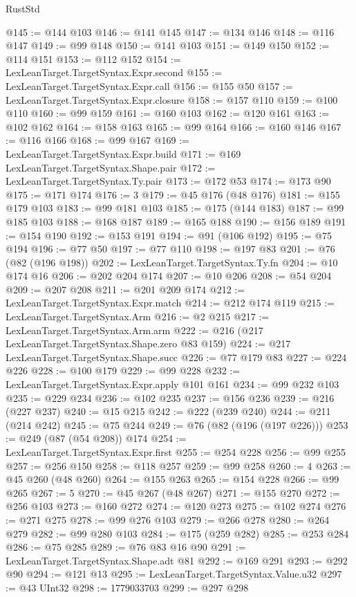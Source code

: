 \begin{lexlean}{RustStd}
\begin{coremodule}
{\begin{coremodule}
{{{{{{{{{{{{{{{{{{{{{{{{{{{{{{{{{@145 := @144 @103
@146 := @141 @145
@147 := @134 @146
@148 := @116 @147
@149 := @99 @148
@150 := @141 @103
@151 := @149 @150
@152 := @114 @151
@153 := @112 @152
@154 := LexLeanTarget.TargetSyntax.Expr.second
@155 := LexLeanTarget.TargetSyntax.Expr.call
@156 := @155 @50
@157 := LexLeanTarget.TargetSyntax.Expr.closure
@158 := @157 @110
@159 := @100 @110
@160 := @99 @159
@161 := @160 @103
@162 := @120 @161
@163 := @102 @162
@164 := @158 @163
@165 := @99 @164
@166 := @160 @146
@167 := @116 @166
@168 := @99 @167
@169 := LexLeanTarget.TargetSyntax.Expr.build
@171 := @169 LexLeanTarget.TargetSyntax.Shape.pair
@172 := LexLeanTarget.TargetSyntax.Ty.pair
@173 := @172 @53
@174 := @173 @90
@175 := @171 @174
@176 := 3
@179 := @45 @176 (@48 @176)
@181 := @155 @179 @103
@183 := @99 @181 @103
@185 := @175 (@144 @183)
@187 := @99 @185 @103
@188 := @168 @187
@189 := @165 @188
@190 := @156 @189
@191 := @154 @190
@192 := @153 @191
@194 := @91 (@106 @192)
@195 := @75 @194
@196 := @77 @50
@197 := @77 @110
@198 := @197 @83
@201 := @76 (@82 (@196 @198))
@202 := LexLeanTarget.TargetSyntax.Ty.fn
@204 := @10 @174 @16
@206 := @202 @204 @174
@207 := @10 @206
@208 := @54 @204
@209 := @207 @208
@211 := @201 @209 @174
@212 := LexLeanTarget.TargetSyntax.Expr.match
@214 := @212 @174 @119
@215 := LexLeanTarget.TargetSyntax.Arm
@216 := @2 @215
@217 := LexLeanTarget.TargetSyntax.Arm.arm
@222 := @216 (@217 LexLeanTarget.TargetSyntax.Shape.zero @83 @159)
@224 := @217 LexLeanTarget.TargetSyntax.Shape.succ
@226 := @77 @179 @83
@227 := @224 @226
@228 := @100 @179
@229 := @99 @228
@232 := LexLeanTarget.TargetSyntax.Expr.apply @101 @161
@234 := @99 @232 @103
@235 := @229 @234
@236 := @102 @235
@237 := @156 @236
@239 := @216 (@227 @237)
@240 := @15 @215
@242 := @222 (@239 @240)
@244 := @211 (@214 @242)
@245 := @75 @244
@249 := @76 (@82 (@196 (@197 @226)))
@253 := @249 (@87 (@54 @208)) @174
@254 := LexLeanTarget.TargetSyntax.Expr.first
@255 := @254 @228
@256 := @99 @255
@257 := @256 @150
@258 := @118 @257
@259 := @99 @258
@260 := 4
@263 := @45 @260 (@48 @260)
@264 := @155 @263
@265 := @154 @228
@266 := @99 @265
@267 := 5
@270 := @45 @267 (@48 @267)
@271 := @155 @270
@272 := @256 @103
@273 := @160 @272
@274 := @120 @273
@275 := @102 @274
@276 := @271 @275
@278 := @99 @276 @103
@279 := @266 @278
@280 := @264 @279
@282 := @99 @280 @103
@284 := @175 (@259 @282)
@285 := @253 @284
@286 := @75 @285
@289 := @76 @83 @16 @90
@291 := LexLeanTarget.TargetSyntax.Shape.adt @81
@292 := @169 @291
@293 := @292 @90
@294 := @121 @13
@295 := LexLeanTarget.TargetSyntax.Value.u32
@297 := @43 UInt32
@298 := 1779033703
@299 := @297 @298
}}}}}}}}}}}}}}}}}}}}}}}}}}}}}}}}}
\end{coremodule}}
\end{coremodule}
\end{lexlean}
